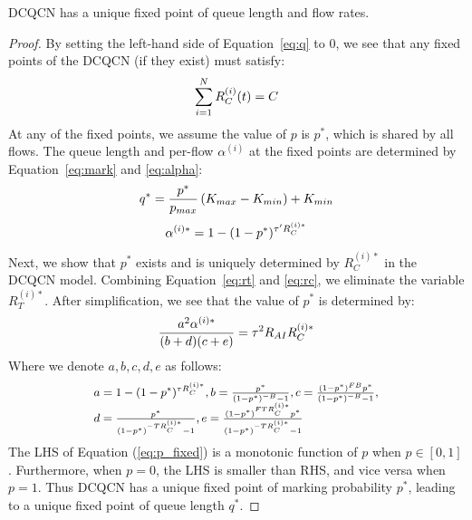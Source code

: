 \begin{thm}
DCQCN has a unique fixed point of queue length and flow rates. 
\end{thm}
\begin{proof}
By setting the left-hand side of Equation~\ref{eq:q} to 0,
we see that any fixed points of the DCQCN (if they exist) must
satisfy:
\begin{equation}
\small
\sum\limits_{i = 1}^N {R_C^{(i)}(t)} = C
\label{eq:fixedrc}
\end{equation}
At any of the fixed points, we assume the value of $p$ is $p^*$, which is shared
by all flows. The queue length and per-flow $\alpha^{(i)}$ at the fixed points
are determined by Equation~\ref{eq:mark} and \ref{eq:alpha}:
\begin{equation}
\small
{q^*} = \frac{{{p^*}}}{{{p_{max}}}}\left( {{K_{max}} - {K_{min}}} \right) + {K_{min}}
\label{eq:fixedq}
\end{equation}
\begin{equation}
\small
\alpha^{(i)*}  = 1 - {(1 - p^*)^{{\tau '}R_C^{(i)*}}}
\end{equation}
Next, we show that $p^*$ exists and is uniquely determined by $R_C^{(i)*}$ in
the DCQCN model. Combining Equation~\ref{eq:rt} and \ref{eq:rc}, 
we eliminate the variable $R_T^{(i)*}$. After simplification, we see that the value 
of $p^*$ is determined by:
\begin{equation}
\small
\frac{{{a^2}\alpha^{(i)*} }}{{(b + d)(c + e)}} = {\tau ^2}{R_{AI}}R_C^{(i)*}
\label{eq:p_fixed}
\end{equation}
Where we denote $a, b, c, d, e$ as follows:
\begin{equation}
\small
\begin{array}{l}
a = 1 - {(1 - p^*)^{\tau {R_C^{(i)*}}}},b = \frac{{p^*}}{{{{(1 - p^*)}^{ - B}} - 1}},c = \frac{{{{(1 - p^*)}^{FB}}p^*}}{{{{(1 - p^*)}^{ - B}} - 1}},\\
d = \frac{{p^*}}{{{{(1 - p^*)}^{ - T{R_C^{(i)*}}}} - 1}},e = \frac{{{{(1 - p^*)}^{FT{R_C^{(i)*}}}}p^*}}{{{{(1 - p^*)}^{ - T{R_C^{(i)*}}}} - 1}}
\end{array}
\end{equation}
The LHS of Equation (\ref{eq:p_fixed}) is a monotonic function of $p$ when $p \in [0,1]$.
Furthermore, when $p = 0$, the LHS is smaller than RHS, and vice versa when $p =
1$. Thus DCQCN has a unique fixed point of marking probability $p^*$, leading to
a unique fixed point of queue length $q^*$.


\end{proof}
